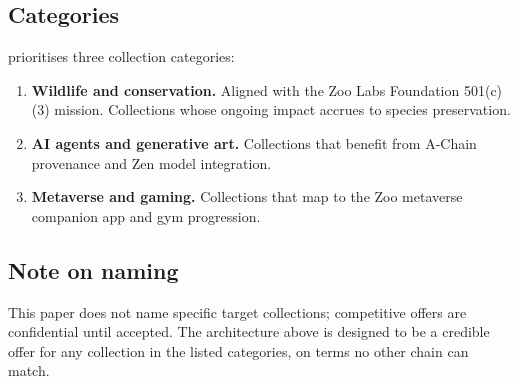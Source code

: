 \subsection{Categories}

\Zoo{} prioritises three collection categories:

\begin{enumerate}[leftmargin=1.4em]
  \item \textbf{Wildlife and conservation.} Aligned with the Zoo Labs
        Foundation 501(c)(3) mission. Collections whose ongoing
        impact accrues to species preservation.
  \item \textbf{AI agents and generative art.} Collections that
        benefit from A-Chain provenance and Zen model integration.
  \item \textbf{Metaverse and gaming.} Collections that map to the
        Zoo metaverse companion app and gym progression.
\end{enumerate}

\subsection{Note on naming}

This paper does not name specific target collections; competitive
offers are confidential until accepted. The architecture above is
designed to be a credible offer for any collection in the listed
categories, on terms no other chain can match.

